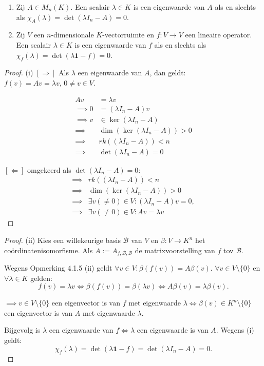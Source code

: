 \begin{stelling}[6.2.5]
    \begin{enumerate}
        \item[(i)] Zij $A \in M_n(K)$. Een scalair $\lambda \in K$ is een eigenwaarde van $A$ als en slechts als $\chi_A(\lambda) = \det(\lambda I_n - A) = 0$.
        \item[(ii)] Zij $V$ een $n$-dimensionale $K$-vectorruimte en $f \colon V \to V$ een lineaire operator. Een scalair $\lambda \in K$ is een eigenwaarde van $f$ als en slechts als $\chi_f(\lambda) = \det(\lambda \mathbf{1} - f) = 0$.
    \end{enumerate}
\end{stelling}
\begin{proof}(i)
    \([\Rightarrow]\) Als \(\lambda\) een eigenwaarde van \(A\), dan geldt:
    \(f(v) = Av =\lambda v, \, 0 \neq v \in V\).

    \begin{align*}
        Av &= \lambda v\\
        \implies 0 &= (\lambda I_n - A)v\\
        \implies v &\in \ker(\lambda I_n - A)\\
        \implies &\dim(\ker(\lambda I_n - A)) > 0\\
        \implies &rk((\lambda I_n - A)) < n \\
        \implies &\det(\lambda I_n - A) = 0
    \end{align*}

    \([\Leftarrow]\) omgekeerd als \(\det(\lambda I_n - A) = 0\):
    \begin{align*}
        \implies &rk((\lambda I_n - A)) < n \\
        \implies &\dim(\ker(\lambda I_n - A)) > 0\\
        \implies & \exists v (\neq 0) \in V: (\lambda I_n - A)v = 0 ,\\
        \implies & \exists v (\neq 0) \in V:  Av = \lambda v
    \end{align*}
\end{proof}
\begin{proof}(ii)
    Kies een willekeurige basis \(\mathcal{B}\) van \(V\) en \(\beta \colon V \to K^n\) het  coördinatenisomorfisme.
    Als \(A := A_{f,\mathcal{B},\mathcal{B}}\) de matrixvoorstelling van \(f\) tov \(\mathcal{B}\).

    Wegens Opmerking 4.1.5 (ii) geldt \( \forall v \in V: \beta(f(v)) = A\beta(v)\).
    \( \forall v \in V \setminus \{0\}\) en \(\forall \lambda \in K\) gelden:
    \[ f(v) = \lambda v \iff \beta(f(v)) = \beta(\lambda v) \iff A\beta(v) = \lambda \beta(v). \]

    \(\implies v \in V \setminus \{0\}\) een eigenvector is van \(f\) met eigenwaarde \(\lambda \iff \beta(v) \in K^n \setminus \{0\}\) een eigenvector is van \(A\) met eigenwaarde \(\lambda\).

    Bijgevolg is \(\lambda\) een eigenwaarde van \(f \iff \lambda\) een eigenwaarde is van \(A\).
    Wegens (i) geldt:
    \[ \chi_f(\lambda) = \det(\lambda \mathbf{1} - f) = \det(\lambda I_n - A) = 0. \]
\end{proof}

